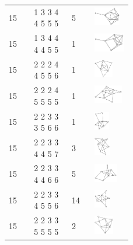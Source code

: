 \begin{footnotesize}
\begin{longtable}{m{0.07\linewidth} m{0.15\linewidth} m{0.05\linewidth} m{0.15\linewidth}}
15 & 1 3 3 4 4 5 5 5 & 5 & \includegraphics[height=0.8cm]{15-universal-graphs/img/degree-sequences-example-graphs/graph-4-8-106}\\
15 & 1 3 4 4 4 4 5 5 & 1 & \includegraphics[height=0.8cm]{15-universal-graphs/img/degree-sequences-example-graphs/graph-4-8-107}\\
15 & 2 2 2 4 4 5 5 6 & 1 & \includegraphics[height=0.8cm]{15-universal-graphs/img/degree-sequences-example-graphs/graph-4-8-108}\\
15 & 2 2 2 4 5 5 5 5 & 1 & \includegraphics[height=0.8cm]{15-universal-graphs/img/degree-sequences-example-graphs/graph-4-8-109}\\
15 & 2 2 3 3 3 5 6 6 & 1 & \includegraphics[height=0.8cm]{15-universal-graphs/img/degree-sequences-example-graphs/graph-4-8-110}\\
15 & 2 2 3 3 4 4 5 7 & 3 & \includegraphics[height=0.8cm]{15-universal-graphs/img/degree-sequences-example-graphs/graph-4-8-111}\\
15 & 2 2 3 3 4 4 6 6 & 5 & \includegraphics[height=0.8cm]{15-universal-graphs/img/degree-sequences-example-graphs/graph-4-8-112}\\
15 & 2 2 3 3 4 5 5 6 & 14 & \includegraphics[height=0.8cm]{15-universal-graphs/img/degree-sequences-example-graphs/graph-4-8-113}\\
15 & 2 2 3 3 5 5 5 5 & 2 & \includegraphics[height=0.8cm]{15-universal-graphs/img/degree-sequences-example-graphs/graph-4-8-114}\\

\end{longtable}
\end{footnotesize}
